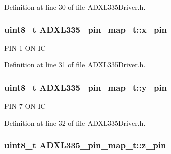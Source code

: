 \-Definition at line 30 of file \-A\-D\-X\-L335\-Driver.\-h.

\hypertarget{struct_a_d_x_l335__pin__map__t_afef2093e06a55328500a75af2935ec1e}{
\subsubsection[{x\-\_\-pin}]{\setlength{\rightskip}{0pt plus 5cm}uint8\-\_\-t {\bf \-A\-D\-X\-L335\-\_\-pin\-\_\-map\-\_\-t\-::x\-\_\-pin}}}\label{struct_a_d_x_l335__pin__map__t_afef2093e06a55328500a75af2935ec1e}

\begin{DoxyItemize}
\item \-P\-I\-N 1 \-O\-N \-I\-C 
\end{DoxyItemize}

\-Definition at line 31 of file \-A\-D\-X\-L335\-Driver.\-h.

\hypertarget{struct_a_d_x_l335__pin__map__t_a85e0d796ba1d6bcf71c0051034111bce}{
\subsubsection[{y\-\_\-pin}]{\setlength{\rightskip}{0pt plus 5cm}uint8\-\_\-t {\bf \-A\-D\-X\-L335\-\_\-pin\-\_\-map\-\_\-t\-::y\-\_\-pin}}}\label{struct_a_d_x_l335__pin__map__t_a85e0d796ba1d6bcf71c0051034111bce}

\begin{DoxyItemize}
\item \-P\-I\-N 7 \-O\-N \-I\-C 
\end{DoxyItemize}

\-Definition at line 32 of file \-A\-D\-X\-L335\-Driver.\-h.

\hypertarget{struct_a_d_x_l335__pin__map__t_a185fe002f0600ecb6a8126b626de569a}{
\subsubsection[{z\-\_\-pin}]{\setlength{\rightskip}{0pt plus 5cm}uint8\-\_\-t {\bf \-A\-D\-X\-L335\-\_\-pin\-\_\-map\-\_\-t\-::z\-\_\-pin}}}\label{struct_a_d_x_l335__pin__map__t_a185fe002f0600ecb6a8126b626de569a}

